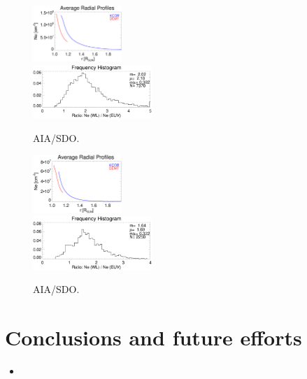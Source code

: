 \documentclass[baaa]{baaa}
\begin{document}
\begin{figure}
  \centering
  \includegraphics[width=0.3\textwidth]{figures/Average_Radial_Profiles_KCOR-Tom_vs_DEMT_CR2198_Hh_l45_kcor_subreg-Quiet-region1.eps}\\
  \includegraphics[width=0.4\textwidth]{figures/comparison_KCOR-Tom_vs_DEMT_CR2198_Hh_l45_kcor_subreg-Quiet-region1_range1105-1195_Rsun.eps}	
  \caption{AIA/SDO.}
  \label{fig_averages}
\end{figure}

\begin{figure}
  \centering
  \includegraphics[width=0.3\textwidth]{figures/Average_Radial_Profiles_KCOR-Tom_vs_DEMT_CR2198_Hh_l45_kcor_subreg-Open-region_N.eps}\\
  \includegraphics[width=0.4\textwidth]{figures/comparison_KCOR-Tom_vs_DEMT_CR2198_Hh_l45_kcor_subreg-Open-region_N_range1105-1155_Rsun.eps}	
  \caption{AIA/SDO.}
  \label{fig_comparisson}
\end{figure}


\section{Conclusions and future efforts}
\begin{itemize}
\item 
\end{itemize}


\small

 
\end{document}
